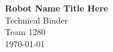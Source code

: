 \begin{titlepage}
  \centering
  \vspace*{2cm}
  {\LARGE\bfseries Robot Name Title Here}\\[1cm]
  \large
  Technical Binder\\[0.5cm]
  Team 1280\\[2cm]
  \today
\end{titlepage}